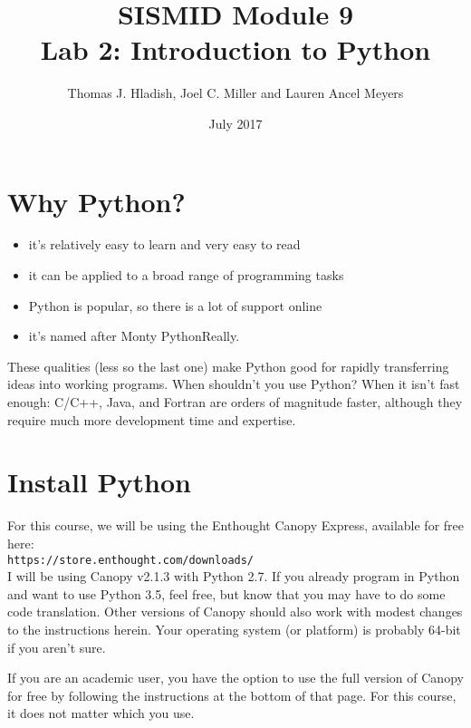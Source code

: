 \documentclass{article}
\begin{document}
\title{SISMID Module 9\\Lab 2: Introduction to Python}
\author{Thomas J. Hladish, Joel C. Miller and Lauren Ancel Meyers}
\date{July 2017}
\maketitle

\section*{Why Python?}
\begin{itemize}
\item it's relatively easy to learn and very easy to read
\item it can be applied to a broad range of programming tasks
\item Python is popular, so there is a lot of support online
\item it's named after Monty Python\textemdash Really.
\end{itemize}

These qualities (less so the last one) make Python good for rapidly transferring ideas into working programs.  When shouldn't you use Python?  When it
isn't fast enough: C/C++, Java, and Fortran are orders of magnitude faster, although they require much more development time and expertise.

\section*{Install Python}

For this course, we will be using the Enthought Canopy Express, available for free here:\\

\texttt{https://store.enthought.com/downloads/}\\

\noindent
I will be using Canopy v2.1.3 with Python 2.7.  If you already program in Python and want to use Python 3.5, feel free, but know that you may have to do some code translation.  Other versions of Canopy should also work with modest changes to the instructions herein.  Your operating system (or platform) is probably 64-bit if you aren't sure.

If you are an academic user, you have the option to use the full version of Canopy for free by following the instructions at the bottom of that page.  For this course, it does not matter which you use.
\end{document}
